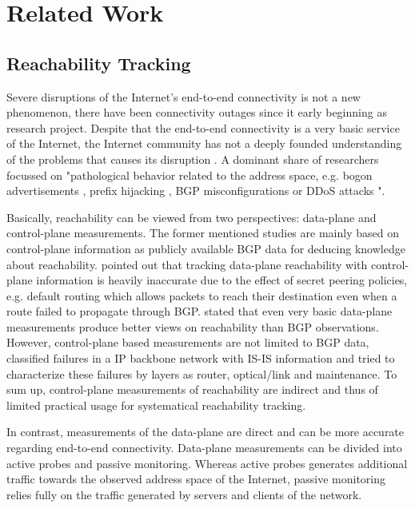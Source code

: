\section{Related Work\label{sec:related_work}} 
\subsection{Reachability Tracking}

Severe disruptions of the Internet's end-to-end connectivity is not a new phenomenon, there have been connectivity outages since it early beginning as research project. Despite that the end-to-end connectivity is a very basic service of the Internet, the Internet community has not a deeply founded understanding of the problems that causes its disruption \citep{Bush:Optometry}. A dominant share of researchers focussed on "pathological behavior related to the address space, e.g. bogon advertisements \citep{Feamster:2005}, prefix hijacking \citep{Zhang:2010}, BGP misconfigurations \citep{Mahajan:2002} or DDoS attacks \citep{Chen:2001}"\citep{Bush:Optometry}.

Basically, reachability can be viewed from two perspectives: data-plane and control-plane measurements. The former mentioned studies are mainly based on control-plane information as publicly available BGP data for deducing knowledge about reachability. \citet{Bush:Optometry} pointed out that tracking data-plane reachability with control-plane information is heavily inaccurate due to the effect of secret peering policies, e.g. default routing which allows packets to reach their destination even when a route failed to propagate through BGP. \citet{Bush:Optometry} stated that even very basic data-plane measurements produce better views on reachability than BGP observations. However, control-plane based measurements are not limited to BGP data, \citet{Markopoulou:2008} classified failures in a IP backbone network with IS-IS information and tried to characterize these failures by layers as router, optical/link and maintenance. To sum up, control-plane measurements of reachability are indirect and thus of limited practical usage for systematical reachability tracking.

In contrast, measurements of the data-plane are direct and can be more accurate regarding end-to-end connectivity. Data-plane measurements can be divided into active probes and passive monitoring. Whereas active probes generates additional traffic towards the observed address space of the Internet, passive monitoring relies fully on the traffic generated by servers and clients of the network.

